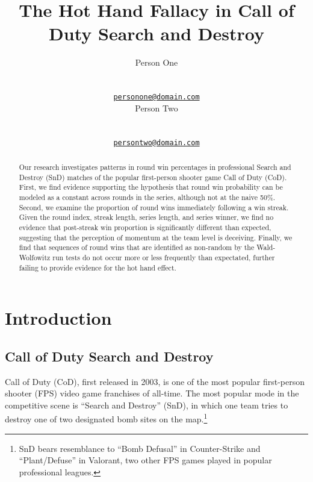 \documentclass{article}
\title{The Hot Hand Fallacy in Call of Duty Search and Destroy}
\author{
    Person One
   \\
     \\
   \\
  \texttt{\href{mailto:personone@domain.com}{\nolinkurl{personone@domain.com}}} \\
   \And
    Person Two
   \\
     \\
   \\
  \texttt{\href{mailto:persontwo@domain.com}{\nolinkurl{persontwo@domain.com}}} \\
  }
\begin{document}
\maketitle


\begin{abstract}
Our research investigates patterns in round win percentages in
professional Search and Destroy (SnD) matches of the popular
first-person shooter game Call of Duty (CoD). First, we find evidence
supporting the hypothesis that round win probability can be modeled as a
constant across rounds in the series, although not at the naive 50\%.
Second, we examine the proportion of round wins immediately following a
win streak. Given the round index, streak length, series length, and
series winner, we find no evidence that post-streak win proportion is
significantly different than expected, suggesting that the perception of
momentum at the team level is deceiving. Finally, we find that sequences
of round wins that are identified as non-random by the Wald-Wolfowitz
run tests do not occur more or less frequently than expectated, further
failing to provide evidence for the hot hand effect.
\end{abstract}


\hypertarget{introduction}{%
\section{Introduction}\label{introduction}}

\hypertarget{call-of-duty-search-and-destroy}{%
\subsection{Call of Duty Search and
Destroy}\label{call-of-duty-search-and-destroy}}

Call of Duty (CoD), first released in 2003, is one of the most popular
first-person shooter (FPS) video game franchises of all-time. The most
popular mode in the competitive scene is ``Search and Destroy'' (SnD),
in which one team tries to destroy one of two designated bomb sites on
the map.\footnote{SnD bears resemblance to ``Bomb Defusal'' in
  Counter-Strike and ``Plant/Defuse'' in Valorant, two other FPS games
  played in popular professional leagues.}
\end{document}
